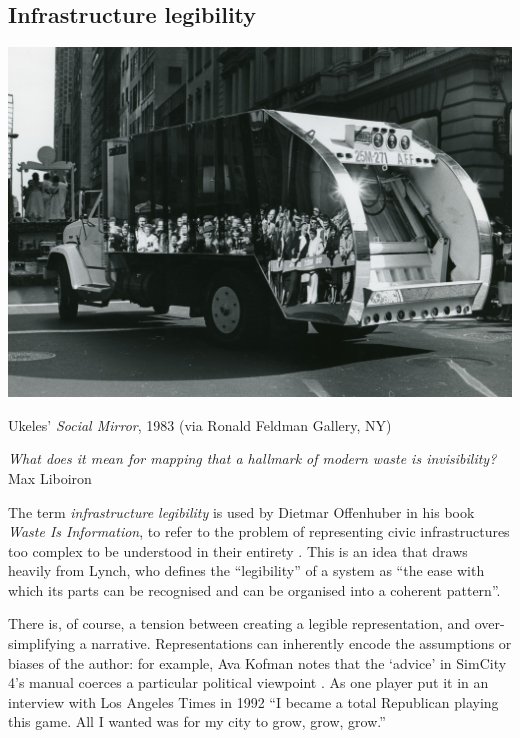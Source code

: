 \documentclass[nofonts,nols,justified,nobib]{tufte-book}
\begin{document}
\subsection*{Infrastructure legibility}

\begin{marginfigure}
\includegraphics[width=\textwidth]{img/1/social-mirror.jpg}
\caption{Ukeles' \emph{Social Mirror}, 1983 (via Ronald Feldman Gallery, NY)}
\end{marginfigure}

\begin{flushright}
\emph{What does it mean for mapping that a hallmark of modern waste is invisibility?}
\cite{liboiron_mapping_2014}\\
Max Liboiron
\end{flushright}

The term \emph{infrastructure legibility} is used by Dietmar Offenhuber in his book \emph{Waste Is Information}, to refer to the problem of representing civic infrastructures too complex to be understood in their entirety \cite{offenhuber_waste_2017}. This is an idea that draws heavily from Lynch, who defines the ``legibility'' of a system as ``the ease with which its parts can be recognised and can be organised into a coherent pattern''. 

There is, of course, a tension between creating a legible representation, and over-simplifying a narrative. Representations can inherently encode the assumptions or biases of the author: for example, Ava Kofman notes that the `advice' in SimCity 4's manual coerces a particular political viewpoint \cite{kofman_les_2014}. As one player put it in an interview with Los Angeles Times in 1992 ``I became a total Republican playing this game. All I wanted was for my city to grow, grow, grow.''\cite{Baker_model_2019}
\end{document}
